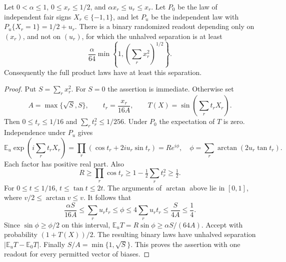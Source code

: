 \begin{lemma}\label{lem:unequalsignals88}
Let $0<\alpha\le1$, $0\le x_r\le1/2$, and
$\alpha x_r\le u_r\le x_r$.  Let $P_0$ be the law of independent
fair signs $X_r\in\{-1,1\}$, and let $P_u$ be the independent law
with $P_u\{X_r=1\}=1/2+u_r$.  There is a binary randomized readout
depending only on $(x_r)$, and not on $(u_r)$, for which the unhalved
separation is at least
\begin{equation}\label{eq:unequalsignals88}
 \frac{\alpha}{64}\min\left\{1,
                         \left(\sum_r x_r^2\right)^{1/2}\right\}.
\end{equation}
Consequently the full product laws have at least this separation.
\end{lemma}
\begin{proof}
Put $S=\sum_r x_r^2$.  For $S=0$ the assertion is immediate.
Otherwise set
\[
 A=\max\{\sqrt S,S\},\qquad
 t_r=\frac{x_r}{16A},\qquad
 T(X)=\sin\left(\sum_r t_rX_r\right).
\]
Then $0\le t_r\le1/16$ and $\sum_r t_r^2\le1/256$.
Under $P_0$ the expectation of $T$ is zero.  Independence under $P_u$
gives
\[
 \mathbb E_u\exp\left(i\sum_r t_rX_r\right)
 =\prod_r(\cos t_r+2iu_r\sin t_r)=R e^{i\phi},
 \quad \phi=\sum_r\arctan(2u_r\tan t_r).
\]
Each factor has positive real part.  Also
\[
 R\ge\prod_r\cos t_r
 \ge1-\tfrac12\sum_r t_r^2\ge\tfrac12.
\]
For $0\le t\le1/16$, $t\le\tan t\le2t$.  The arguments of
$\arctan$ above lie in $[0,1]$, where $v/2\le\arctan v\le v$.
It follows that
\[
 \frac{\alpha S}{16A}\le\sum_r u_rt_r\le\phi
 \le4\sum_r u_rt_r\le\frac{S}{4A}\le\frac14.
\]
Since $\sin\phi\ge\phi/2$ on this interval,
$\mathbb E_uT=R\sin\phi\ge\alpha S/(64A)$.
Accept with probability $(1+T(X))/2$.  The resulting binary laws
have unhalved separation $|\mathbb E_uT-\mathbb E_0T|$.
Finally $S/A=\min\{1,\sqrt S\}$.  This proves the assertion with
one readout for every permitted vector of biases.
\end{proof}

